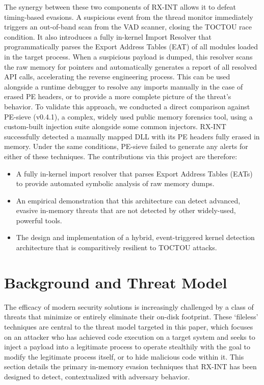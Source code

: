 \documentclass[journal]{IEEEtran}
\begin{document}
The synergy between these two components of RX-INT allows it to defeat timing-based evasions. A suspicious event from the thread monitor immediately triggers an out-of-band scan from the VAD scanner, closing the TOCTOU race condition. It also introduces a fully in-kernel Import Resolver that programmatically parses the Export Address Tables (EAT) of all modules loaded in the target process. When a suspicious payload is dumped, this resolver scans the raw memory for pointers and automatically generates a report of all resolved API calls, accelerating the reverse engineering process. This can be used alongside a runtime debugger to resolve any imports manually in the case of erased PE headers, or to provide a more complete picture of the threat's behavior.
To validate this approach, we conducted a direct comparison against PE-sieve (v0.4.1), a complex, widely used public memory forensics tool, using a custom-built injection suite alongside some common injectors. RX-INT successfully detected a manually mapped DLL with its PE headers fully erased in memory. Under the same conditions, PE-sieve failed to generate any alerts for either of these techniques.
The contributions via this project are therefore:
\begin{itemize}
    \item A fully in-kernel import resolver that parses Export Address Tables (EATs) to provide automated symbolic analysis of raw memory dumps.
    \item An empirical demonstration that this architecture can detect advanced, evasive in-memory threats that are not detected by other widely-used, powerful tools.
    \item The design and implementation of a hybrid, event-triggered kernel detection architecture that is comparitively resilient to TOCTOU attacks.
\end{itemize}

\section{Background and Threat Model}\label{sec:background}
The efficacy of modern security solutions is increasingly challenged by a class of threats that minimize or entirely eliminate their on-disk footprint. These `fileless' techniques are central to the threat model targeted in this paper, which focuses on an attacker who has achieved code execution on a target system and seeks to inject a payload into a legitimate process to operate stealthily with the goal to modify the legitimate process itself, or to hide malicious code within it. This section details the primary in-memory evasion techniques that RX-INT has been designed to detect, contextualized with adversary behavior.
\end{document}
